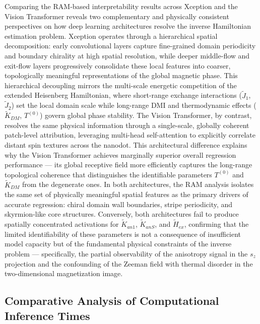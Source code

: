 \documentclass[final,5p,times,twocolumn]{elsarticle}
\begin{document}
Comparing the RAM-based interpretability results 
across Xception and the Vision Transformer reveals 
two complementary and physically consistent 
perspectives on how deep learning architectures 
resolve the inverse Hamiltonian estimation problem. 
Xception operates through a hierarchical spatial 
decomposition: early convolutional layers capture 
fine-grained domain periodicity and boundary 
chirality at high spatial resolution, while deeper 
middle-flow and exit-flow layers progressively 
consolidate these local features into coarser, 
topologically meaningful representations of the 
global magnetic phase. This hierarchical decoupling 
mirrors the multi-scale energetic competition of the 
extended Heisenberg Hamiltonian, where short-range 
exchange interactions ($\tilde{J}_1$, $\tilde{J}_2$) 
set the local domain scale while long-range DMI 
and thermodynamic effects ($\tilde{K}_{DM}$, 
$T^{(0)}$) govern global phase stability. The Vision 
Transformer, by contrast, resolves the same physical 
information through a single-scale, globally coherent 
patch-level attribution, leveraging multi-head 
self-attention to explicitly correlate distant spin 
textures across the nanodot. This architectural 
difference explains why the Vision Transformer 
achieves marginally superior overall regression 
performance --- its global receptive field more 
efficiently captures the long-range topological 
coherence that distinguishes the identifiable 
parameters $T^{(0)}$ and $\tilde{K}_{DM}$ from 
the degenerate ones. In both architectures, the 
RAM analysis isolates the same set of physically 
meaningful spatial features as the primary drivers 
of accurate regression: chiral domain wall 
boundaries, stripe periodicity, and skyrmion-like 
core structures. Conversely, both architectures 
fail to produce spatially concentrated activations 
for $\tilde{K}_{an1}$, $\tilde{K}_{anS}$, and 
$\tilde{H}_{ex}$, confirming that the limited 
identifiability of these parameters is not a 
consequence of insufficient model capacity but of 
the fundamental physical constraints of the inverse 
problem --- specifically, the partial observability 
of the anisotropy signal in the $s_z$ projection 
and the confounding of the Zeeman field with 
thermal disorder in the two-dimensional 
magnetization image.



\subsection{Comparative Analysis of Computational 
Inference Times}
\label{sec:inference_times}
\end{document}
